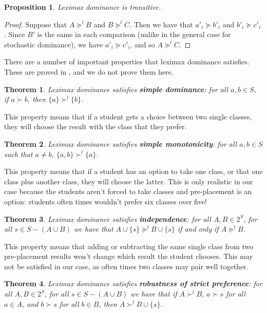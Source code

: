 \documentclass[12pt,letterpaper]{extarticle}
\newtheorem{prop}{Proposition}
\newtheorem{theo}{Theorem}
\begin{document}
\begin{prop}
Leximax dominance is transitive.
\end{prop}

\begin{proof}
Suppose that $A \succcurlyeq^l B$ and $B \succcurlyeq^l C$. Then we have that $a'_i \succcurlyeq b'_i$ and $b'_i \succcurlyeq c'_i$. Since $B'$ is the same in each comparison (unlike in the general case for stochastic dominance), we have $a'_i \succcurlyeq c'_i$, and so $A \succcurlyeq^l C$.
\end{proof}

There are a number of important properties that leximax dominance satisfies. These are proved in \cite{bossert}, and we do not prove them here.

\begin{theo}
Leximax dominance satisfies \textbf{simple dominance}: for all $a,b \in S$, if $a \succ b$, then $\{a\} \succ^l \{b\}$.
\end{theo}

This property means that if a student gets a choice between two single classes, they will choose the result with the class that they prefer.

\begin{theo}
Leximax dominance satisfies \textbf{simple monotonicity}: for all $a,b \in S$ such that $a \neq b$, $\{a,b\} \succ^l \{a\}$.
\end{theo}

This property means that if a student has an option to take one class, or that one class plus another class, they will choose the latter. This is only realistic in our case because the students aren't forced to take classes and pre-placement is an option: students often times wouldn't prefer six classes over five!

\begin{theo}
Leximax dominance satisfies \textbf{independence}: for all $A,B \in 2^S$, for all $s \in S - (A \cup B)$ we have that $A \cup \{s\} \succcurlyeq^l B \cup \{s\}$ if and only if $A  \succcurlyeq^l B$.
\end{theo}

This property means that adding or subtracting the same single class from two pre-placement results won't change which result the student chooses. This may not be satisfied in our case, as often times two classes may pair well together.

\begin{theo}
Leximax dominance satisfies \textbf{robustness of strict preference}: for all $A,B \in 2^S$, for all $s \in S - (A \cup B)$ we have that if $A \succ^l B$, $a \succ s$ for all $a \in A$, and $b \succ s$ for all $b \in B$, then $A \succ^l B \cup \{s\}$.
\end{theo}
\end{document}
